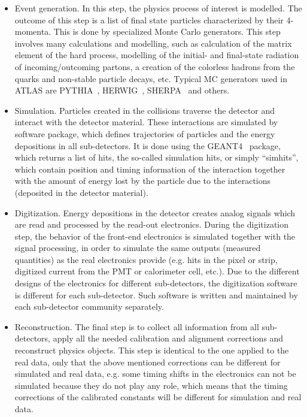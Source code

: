 \begin{itemize}
 \item Event generation. In this step, the physics process of interest is modelled. The outcome of this step is a list of final state particles characterized by their 4-momenta. 
This is done by specialized Monte Carlo generators. 
This step involves many calculations and modelling, such as calculation of the matrix element of the hard process, modelling of the initial- and final-state radiation of incoming/outcoming partons, a creation of the colorless hadrons from the quarks and non-stable particle decays, etc. 
Typical MC generators used in ATLAS
 are PYTHIA~\cite{Pythia}, HERWIG~\cite{Herwig2}, SHERPA~\cite{Sherpa} and others.
 \item Simulation. Particles created in the collisions traverse the detector and interact with the detector material. These interactions are simulated by software package, which defines trajectories of particles and the energy depositions in all sub-detectors. 
 It is done using the GEANT4~\cite{Agostinelli:2002hh} package, which returns a list of hits, the so-called simulation hits, or simply ``simhits'', which contain position and timing information of 
 the interaction together with the amount of energy lost by the particle due to the interactions (deposited in the detector material).
 \item Digitization. Energy depositions in the detector creates analog signals which are read and processed by the read-out electronics. During the digitization step, the behavior of the front-end electronics is simulated together with the signal processing, in order to simulate the same outputs (measured quantities) as the real electronics provide (e.g. hits in the pixel or strip,
 digitized current from the PMT or calorimeter cell, etc.). Due to the different designs of the electronics for different sub-detectors, the digitization software is different for each sub-detector.
 Such software is written and maintained by each sub-detector community separately.
 \item Reconstruction. The final step is to collect all information from all sub-detectors, apply all the needed calibration and alignment corrections and reconstruct physics objects. This step is identical to the one applied to the real data, only that the above mentioned corrections can be different for simulated and real 
 data, e.g. some timing shifts in the electronics can not be simulated because they do not play any role, which means that the timing corrections of the calibrated constants will be different for simulation and real data.
\end{itemize}

